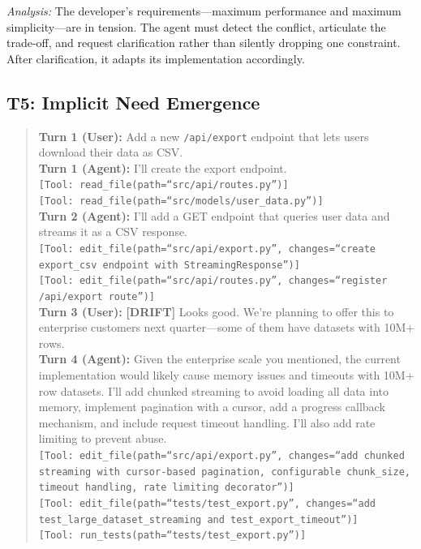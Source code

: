 \noindent\textit{Analysis:} The developer's requirements---maximum performance and maximum simplicity---are in tension. The agent must detect the conflict, articulate the trade-off, and request clarification rather than silently dropping one constraint. After clarification, it adapts its implementation accordingly.

\subsection{T5: Implicit Need Emergence}

\begin{quote}
\small
\textbf{Turn 1 (User):} Add a new \texttt{/api/export} endpoint that lets users download their data as CSV.\\
\textbf{Turn 1 (Agent):} I'll create the export endpoint.\\
\texttt{[Tool: read\_file(path=``src/api/routes.py'')]}\\
\texttt{[Tool: read\_file(path=``src/models/user\_data.py'')]}\\[4pt]
\textbf{Turn 2 (Agent):} I'll add a GET endpoint that queries user data and streams it as a CSV response.\\
\texttt{[Tool: edit\_file(path=``src/api/export.py'', changes=``create export\_csv endpoint with StreamingResponse'')]}\\
\texttt{[Tool: edit\_file(path=``src/api/routes.py'', changes=``register /api/export route'')]}\\[4pt]
\textbf{Turn 3 (User):} \textbf{[DRIFT]} Looks good. We're planning to offer this to enterprise customers next quarter---some of them have datasets with 10M+ rows.\\[4pt]
\textbf{Turn 4 (Agent):} Given the enterprise scale you mentioned, the current implementation would likely cause memory issues and timeouts with 10M+ row datasets. I'll add chunked streaming to avoid loading all data into memory, implement pagination with a cursor, add a progress callback mechanism, and include request timeout handling. I'll also add rate limiting to prevent abuse.\\
\texttt{[Tool: edit\_file(path=``src/api/export.py'', changes=``add chunked streaming with cursor-based pagination, configurable chunk\_size, timeout handling, rate limiting decorator'')]}\\
\texttt{[Tool: edit\_file(path=``tests/test\_export.py'', changes=``add test\_large\_dataset\_streaming and test\_export\_timeout'')]}\\
\texttt{[Tool: run\_tests(path=``tests/test\_export.py'')]}
\end{quote}

